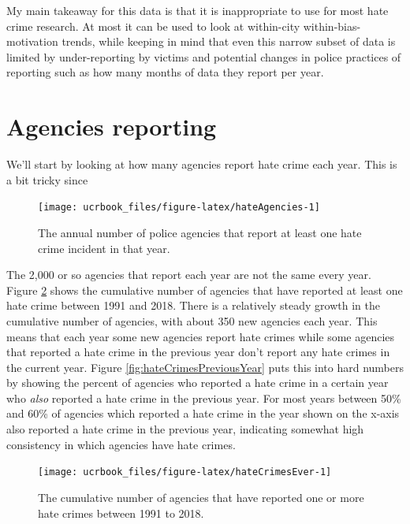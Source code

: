 \documentclass[
  12pt,
  openany]{book}
\begin{document}
My main takeaway for this data is that it is inappropriate to use for most hate crime research. At most it can be used to look at within-city within-bias-motivation trends, while keeping in mind that even this narrow subset of data is limited by under-reporting by victims and potential changes in police practices of reporting such as how many months of data they report per year.

\hypertarget{agencies-reporting-2}{%
\section{Agencies reporting}\label{agencies-reporting-2}}

We'll start by looking at how many agencies report hate crime each year. This is a bit tricky since

\begin{figure}

{\centering \texttt{[image: ucrbook\_files/figure-latex/hateAgencies-1]} 

}

\caption{The annual number of police agencies that report at least one hate crime incident in that year.}\label{fig:hateAgencies}
\end{figure}

The 2,000 or so agencies that report each year are not the same every year. Figure \ref{fig:hateCrimesEver} shows the cumulative number of agencies that have reported at least one hate crime between 1991 and 2018. There is a relatively steady growth in the cumulative number of agencies, with about 350 new agencies each year. This means that each year some new agencies report hate crimes while some agencies that reported a hate crime in the previous year don't report any hate crimes in the current year. Figure \ref{fig:hateCrimesPreviousYear} puts this into hard numbers by showing the percent of agencies who reported a hate crime in a certain year who \emph{also} reported a hate crime in the previous year. For most years between 50\% and 60\% of agencies which reported a hate crime in the year shown on the x-axis also reported a hate crime in the previous year, indicating somewhat high consistency in which agencies have hate crimes.

\begin{figure}

{\centering \texttt{[image: ucrbook\_files/figure-latex/hateCrimesEver-1]} 

}

\caption{The cumulative number of agencies that have reported one or more hate crimes between 1991 to 2018.}\label{fig:hateCrimesEver}
\end{figure}
\end{document}
